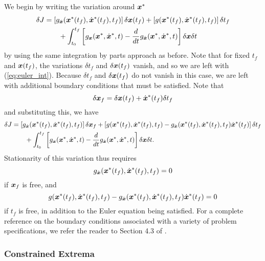 We begin by writing the variation around $\bm{x}^*$
\begin{align}
\delta J &= \left[ g_{\dot{\bm{x}}}(\bm{x}^*(t_f),\dot{\bm{x}}^*(t_f),t_f) \right] \delta \bm{x}(t_f) + 
\left[ g(\bm{x}^*(t_f),\dot{\bm{x}}^*(t_f),t_f) \right] \delta t_f\\
& \qquad + \int_{t_0}^{t_f} \left[ g_{\bm{x}}(\bm{x}^*,\dot{\bm{x}}^*,t) - \frac{d}{dt} g_{\dot{\bm{x}}}(\bm{x}^*,\dot{\bm{x}}^*,t)\right] \delta \bm{x} \delta t \nonumber
\end{align}
by using the same integration by parts approach as before. Note that for fixed $t_f$ and $\bm{x}(t_f)$, the variations $\delta t_f$ and $\delta \bm{x}(t_f)$ vanish, and so we are left with (\ref{eq:euler_int}). Because $\delta t_f$ and $\delta \bm{x}(t_f)$ do not vanish in this case, we are left with additional boundary conditions that must be satisfied. Note that 
\begin{equation}
    \delta \bm{x}_f = \delta \bm{x}(t_f) + \dot{\bm{x}}^*(t_f) \delta t_f
\end{equation}
and substituting this, we have
\begin{align}
\delta J &= \left[ g_{\dot{\bm{x}}}(\bm{x}^*(t_f),\dot{\bm{x}}^*(t_f),t_f) \right] \delta \bm{x}_f + 
\left[ g(\bm{x}^*(t_f),\dot{\bm{x}}^*(t_f),t_f) - g_{\dot{\bm{x}}}(\bm{x}^*(t_f),\dot{\bm{x}}^*(t_f),t_f) \dot{\bm{x}}^*(t_f) \right] \delta t_f\\
& \qquad + \int_{t_0}^{t_f} \left[ g_{\bm{x}}(\bm{x}^*,\dot{\bm{x}}^*,t) - \frac{d}{dt} g_{\dot{\bm{x}}}(\bm{x}^*,\dot{\bm{x}}^*,t)\right] \delta \bm{x} \delta t \nonumber.
\end{align}
Stationarity of this variation thus requires 
\begin{equation}
    g_{\dot{\bm{x}}}(\bm{x}^*(t_f),\dot{\bm{x}}^*(t_f),t_f) = 0
\end{equation} 
if $\bm{x}_f$ is free, and 
\begin{equation}
    g(\bm{x}^*(t_f),\dot{\bm{x}}^*(t_f),t_f) - g_{\dot{\bm{x}}}(\bm{x}^*(t_f),\dot{\bm{x}}^*(t_f),t_f) \dot{\bm{x}}^*(t_f) = 0
\end{equation}
if $t_f$ is free, in addition to the Euler equation being satisfied. For a complete reference on the boundary conditions associated with a variety of problem specifications, we refer the reader to Section 4.3 of \cite{kirk2012optimal}.


\subsubsection{Constrained Extrema}

